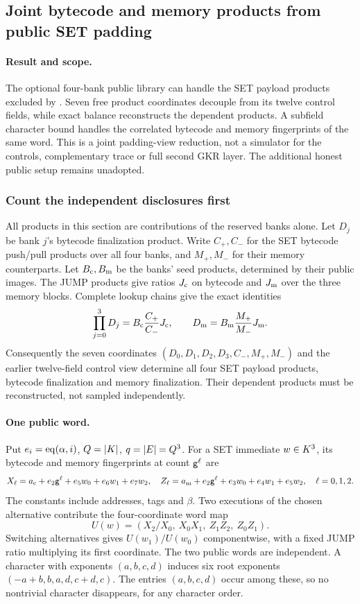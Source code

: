 \subsection{Joint bytecode and memory products from public SET padding}\label{note:zk-set-payload-products}

\paragraph{Result and scope.} The optional four-bank public library can handle the SET payload products excluded by . Seven free product coordinates decouple from its twelve control fields, while exact balance reconstructs the dependent products. A subfield character bound handles the correlated bytecode and memory fingerprints of the same word. This is a joint padding-view reduction, not a simulator for the controls, complementary trace or full second GKR layer. The additional honest public setup remains unadopted.

\subsubsection{Count the independent disclosures first}

All products in this section are contributions of the reserved banks alone. Let $D_j$ be bank $j$'s bytecode finalization product. Write $C_+,C_-$ for the SET bytecode push/pull products over all four banks, and $M_+,M_-$ for their memory counterparts. Let $B_{\rm c},B_{\rm m}$ be the banks' seed products, determined by their public images. The JUMP products give ratios $J_{\rm c}$ on bytecode and $J_{\rm m}$ over the three memory blocks. Complete lookup chains give the exact identities
\[
 \prod_{j=0}^3D_j=B_{\rm c}\frac{C_+}{C_-}J_{\rm c},
 \qquad D_{\rm m}=B_{\rm m}\frac{M_+}{M_-}J_{\rm m}.
\]
Consequently the seven coordinates $(D_0,D_1,D_2,D_3,C_-,M_+,M_-)$ and the earlier twelve-field control view determine all four SET payload products, bytecode finalization and memory finalization. Their dependent products must be reconstructed, not sampled independently.

\paragraph{One public word.} Put $e_i=\operatorname{eq}(\alpha,i)$, $Q=|K|$, $q=|E|=Q^3$. For a SET immediate $w\in K^3$, its bytecode and memory fingerprints at count $\mathsf{g}^\ell$ are
\[
 X_\ell=a_{\rm c}+e_2\mathsf{g}^\ell+e_5w_0+e_6w_1+e_7w_2,
 \quad
 Z_\ell=a_{\rm m}+e_2\mathsf{g}^\ell+e_3w_0+e_4w_1+e_5w_2,
 \quad \ell=0,1,2.
\]
The constants include addresses, tags and $\beta$. Two executions of the chosen alternative contribute the four-coordinate word map
\[
 U(w)=\left(X_2/X_0,\ X_0X_1,\ Z_1Z_2,\ Z_0Z_1\right).
\]
Switching alternatives gives $U(w_1)/U(w_0)$ componentwise, with a fixed JUMP ratio multiplying its first coordinate. The two public words are independent. A character with exponents $(a,b,c,d)$ induces six root exponents $(-a+b,b,a,d,c+d,c)$. The entries $(a,b,c,d)$ occur among these, so no nontrivial character disappears, for any character order.

